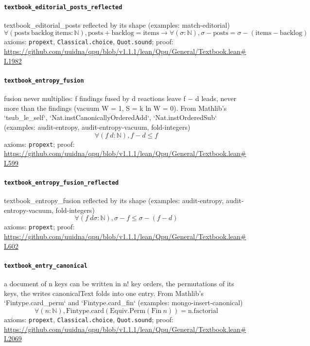 \documentclass[11pt]{article}
\begin{document}
\paragraph{\texttt{textbook\_editorial\_posts\_reflected}}
textbook\_editorial\_posts reflected by its shape (examples: match-editorial)
\[ \forall (\mathrm{posts}\ \mathrm{backlog}\ \mathrm{items} : \mathbb{N}), \mathrm{posts} + \mathrm{backlog} = \mathrm{items} \to \forall (\sigma : \mathbb{N}), \sigma - \mathrm{posts} = \sigma - (\mathrm{items} - \mathrm{backlog}) \]
\noindent axioms: \texttt{propext}, \texttt{Classical.choice}, \texttt{Quot.sound}; proof: \url{https://github.com/uuidna/qpu/blob/v1.1.1/lean/Qpu/General/Textbook.lean\#L1982}

\paragraph{\texttt{textbook\_entropy\_fusion}}
fusion never multiplies: f findings fused by d reactions leave f − d leads, never more than the findings (vacuum W = 1, S = k ln W = 0). From Mathlib's `tsub\_le\_self`, `Nat.instCanonicallyOrderedAdd`, `Nat.instOrderedSub` (examples: audit-entropy, audit-entropy-vacuum, fold-integers)
\[ \forall (f\ d : \mathbb{N}), f - d \le f \]
\noindent axioms: \texttt{propext}; proof: \url{https://github.com/uuidna/qpu/blob/v1.1.1/lean/Qpu/General/Textbook.lean\#L599}

\paragraph{\texttt{textbook\_entropy\_fusion\_reflected}}
textbook\_entropy\_fusion reflected by its shape (examples: audit-entropy, audit-entropy-vacuum, fold-integers)
\[ \forall (f\ d \sigma : \mathbb{N}), \sigma - f \le \sigma - (f - d) \]
\noindent axioms: \texttt{propext}; proof: \url{https://github.com/uuidna/qpu/blob/v1.1.1/lean/Qpu/General/Textbook.lean\#L602}

\paragraph{\texttt{textbook\_entry\_canonical}}
a document of n keys can be written in n! key orders, the permutations of its keys, the writes canonicalText folds into one entry. From Mathlib's `Fintype.card\_perm` and `Fintype.card\_fin` (examples: mongo-insert-canonical)
\[ \forall (n : \mathbb{N}), \mathrm{Fintype.card} (\mathrm{Equiv.Perm} (\mathrm{Fin}\ n)) = \mathrm{n.factorial} \]
\noindent axioms: \texttt{propext}, \texttt{Classical.choice}, \texttt{Quot.sound}; proof: \url{https://github.com/uuidna/qpu/blob/v1.1.1/lean/Qpu/General/Textbook.lean\#L2069}
\end{document}
